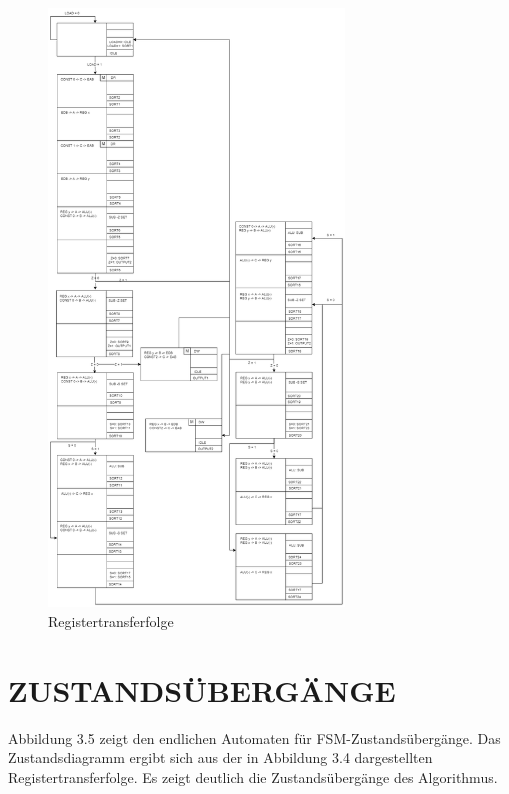 \begin{figure}[H]
  \centering
  \includegraphics[width=0.7\textwidth]{images/Registertransferfolge.png}
  \caption[Registertransferfolge]{Registertransferfolge}
  \label{fig:Registertransferfolge}
\end{figure}

\section{ZUSTANDSÜBERGÄNGE}

Abbildung 3.5 zeigt den endlichen Automaten für FSM-Zustandsübergänge. Das Zustandsdiagramm ergibt sich aus der in Abbildung 3.4 dargestellten Registertransferfolge. Es zeigt deutlich die Zustandsübergänge des Algorithmus.

